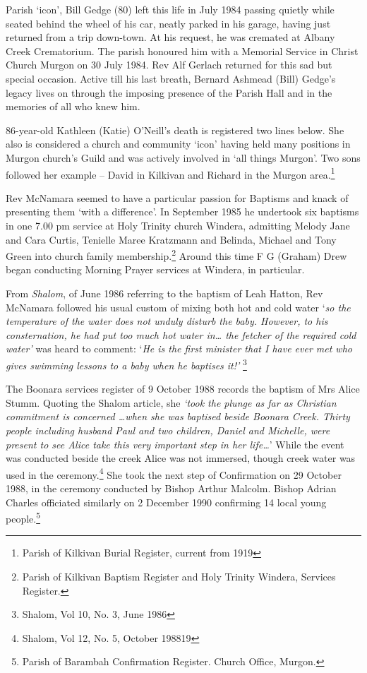 Parish `icon', Bill Gedge (80) left this life in July 1984 passing quietly while seated behind the wheel of his car, neatly parked in his garage, having just returned from a trip down-town. At his request, he was cremated at Albany Creek Crematorium. The parish honoured him with a Memorial Service in Christ Church Murgon on 30 July 1984. Rev Alf Gerlach returned for this sad but special occasion. Active till his last breath, Bernard Ashmead (Bill) Gedge's legacy lives on through the imposing presence of the Parish Hall and in the memories of all who knew him.



86-year-old Kathleen (Katie) O'Neill's death is registered two lines below. She also is considered a church and community `icon' having held many positions in Murgon church's Guild and was actively involved in `all things Murgon'. Two sons followed her example -- David in Kilkivan and Richard in the Murgon area.\footnote{Parish of Kilkivan Burial Register, current from 1919}


Rev McNamara seemed to have a particular passion for Baptisms and knack of presenting them `with a difference'. In September 1985 he undertook six baptisms in one 7.00 pm service at Holy Trinity church Windera, admitting Melody Jane and Cara Curtis, Tenielle Maree Kratzmann and Belinda, Michael and Tony Green into church family membership.\footnote{Parish of Kilkivan Baptism Register and Holy Trinity Windera, Services Register.} Around this time F G (Graham) Drew began conducting Morning Prayer services at Windera, in particular.


From \emph{Shalom}, of June 1986 referring to the baptism of Leah Hatton, Rev McNamara followed his usual custom of mixing both hot and cold water `\emph{so the temperature of the water does not unduly disturb the baby. However, to his consternation, he had put too much hot water in\ldots{} the fetcher of the required cold water'} was heard to comment: `\emph{He is the first minister that I have ever met who gives swimming lessons to a baby when he baptises it!'} \footnote{Shalom, Vol 10, No. 3, June 1986}


The Boonara services register of 9 October 1988 records the baptism of Mrs Alice Stumm. Quoting the Shalom article, she \emph{`took the plunge as far as Christian commitment is concerned \ldots when she was baptised beside Boonara Creek. Thirty people including husband Paul and two children, Daniel and Michelle, were present to see Alice take this very important step in her life\ldots{}}' While the event was conducted beside the creek Alice was not immersed, though creek water was used in the ceremony.\footnote{Shalom, Vol 12, No. 5, October 198819} She took the next step of Confirmation on 29 October 1988, in the ceremony conducted by Bishop Arthur Malcolm. Bishop Adrian Charles officiated similarly on 2 December 1990 confirming 14 local young people.\footnote{Parish of Barambah Confirmation Register. Church Office, Murgon.}


